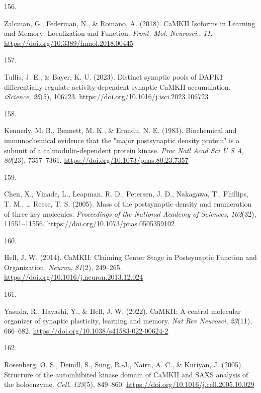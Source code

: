 \documentclass[
  11pt,
  letterpaper,
]{scrreprt}
\newlength{\cslhangindent}
\newlength{\csllabelwidth}
\newenvironment{CSLReferences}[2] %
 {\begin{list}{}{%
  \setlength{\itemindent}{0pt}
  \setlength{\leftmargin}{0pt}
  \setlength{\parsep}{0pt}
  \ifodd #1
   \setlength{\leftmargin}{\cslhangindent}
   \setlength{\itemindent}{-1\cslhangindent}
  \fi
  \setlength{\itemsep}{#2\baselineskip}}}
 {\end{list}}
\newcommand{\CSLLeftMargin}[1]{\parbox[t]{\csllabelwidth}{\strut#1\strut}}
\newcommand{\CSLRightInline}[1]{\parbox[t]{\linewidth - \csllabelwidth}{\strut#1\strut}}
\begin{document}
\begin{CSLReferences}{0}{0}
\CSLLeftMargin{156. }%
\CSLRightInline{Zalcman, G., Federman, N., \& Romano, A. (2018). {CaMKII
Isoforms} in {Learning} and {Memory}: {Localization} and {Function}.
\emph{Front. Mol. Neurosci.}, \emph{11}.
\url{https://doi.org/10.3389/fnmol.2018.00445}}

\CSLLeftMargin{157. }%
\CSLRightInline{Tullis, J. E., \& Bayer, K. U. (2023). Distinct synaptic
pools of {DAPK1} differentially regulate activity-dependent synaptic
{CaMKII} accumulation. \emph{iScience}, \emph{26}(5), 106723.
\url{https://doi.org/10.1016/j.isci.2023.106723}}

\CSLLeftMargin{158. }%
\CSLRightInline{Kennedy, M. B., Bennett, M. K., \& Erondu, N. E. (1983).
Biochemical and immunochemical evidence that the "major postsynaptic
density protein" is a subunit of a calmodulin-dependent protein kinase.
\emph{Proc Natl Acad Sci U S A}, \emph{80}(23), 7357--7361.
\url{https://doi.org/10.1073/pnas.80.23.7357}}

\CSLLeftMargin{159. }%
\CSLRightInline{Chen, X., Vinade, L., Leapman, R. D., Petersen, J. D.,
Nakagawa, T., Phillips, T. M., \ldots{} Reese, T. S. (2005). Mass of the
postsynaptic density and enumeration of three key molecules.
\emph{Proceedings of the National Academy of Sciences}, \emph{102}(32),
11551--11556. \url{https://doi.org/10.1073/pnas.0505359102}}

\CSLLeftMargin{160. }%
\CSLRightInline{Hell, J. W. (2014). {CaMKII}: {Claiming Center Stage} in
{Postsynaptic Function} and {Organization}. \emph{Neuron}, \emph{81}(2),
249--265. \url{https://doi.org/10.1016/j.neuron.2013.12.024}}

\CSLLeftMargin{161. }%
\CSLRightInline{Yasuda, R., Hayashi, Y., \& Hell, J. W. (2022).
{CaMKII}: A central molecular organizer of synaptic plasticity, learning
and memory. \emph{Nat Rev Neurosci}, \emph{23}(11), 666--682.
\url{https://doi.org/10.1038/s41583-022-00624-2}}

\CSLLeftMargin{162. }%
\CSLRightInline{Rosenberg, O. S., Deindl, S., Sung, R.-J., Nairn, A. C.,
\& Kuriyan, J. (2005). Structure of the autoinhibited kinase domain of
{CaMKII} and {SAXS} analysis of the holoenzyme. \emph{Cell},
\emph{123}(5), 849--860.
\url{https://doi.org/10.1016/j.cell.2005.10.029}}


\end{CSLReferences}
\end{document}
